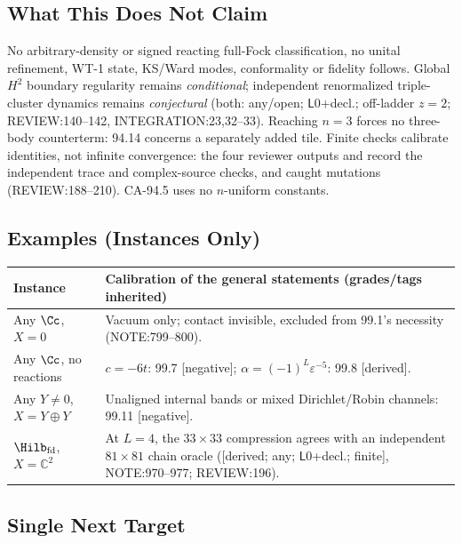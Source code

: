 \subsection{What This Does Not Claim}
No arbitrary-density or signed reacting full-Fock classification, no unital refinement, WT-1 state, KS/Ward modes,
conformality or fidelity follows. Global \(H^2\) boundary regularity remains \emph{conditional}; independent renormalized
triple-cluster dynamics remains \emph{conjectural} (both: any/open; \(\mathsf L0\)+decl.; off-ladder \(z=2\);
REVIEW:140--142, INTEGRATION:23,32--33). Reaching \(n=3\) forces no three-body counterterm: 94.14 concerns a separately added tile.
Finite checks calibrate identities, not infinite convergence: the four reviewer outputs and 
record the independent trace and complex-source checks, and caught mutations (REVIEW:188--210). CA-94.5 uses no \(n\)-uniform constants.

\subsection{Examples (Instances Only)}
\begin{center}\footnotesize
\begin{tabular}{p{3.2cm}p{10.5cm}}\toprule
Instance & Calibration of the general statements (grades/tags inherited) \\\midrule
Any \(\Cc\), \(X=0\) & Vacuum only; contact invisible, excluded from 99.1's necessity (NOTE:799--800). \\
Any \(\Cc\), no reactions & \(c=-6t\): 99.7 [negative]; \(\alpha=(-1)^L\varepsilon^{-5}\): 99.8 [derived]. \\
Any \(Y\ne0\), \(X=Y\oplus Y\) & Unaligned internal bands or mixed Dirichlet/Robin channels: 99.11 [negative]. \\
\(\Hilb_{\rm fd}\), \(X=\mathbb C^2\) & At \(L=4\), the \(33\times33\) compression agrees with an independent \(81\times81\) chain oracle
([derived; any; \(\mathsf L0\)+decl.; finite], NOTE:970--977; REVIEW:196). \\\bottomrule
\end{tabular}\end{center}

\subsection{Single Next Target}

